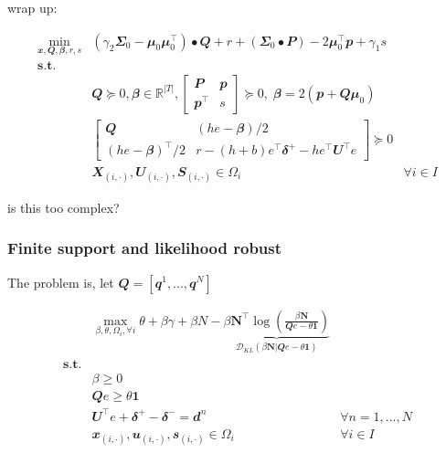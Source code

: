 \documentclass[
  a4paper,
,tablecaptionabove
]{scrartcl}
\numberwithin{equation}{section}
\begin{document}
wrap up:

\[\begin{aligned}
\min_{\mathbfit{x}, \mathbfit{Q}, \mathbfit{\beta}, r, s} & \left(\gamma_{2} \mathbfit{\Sigma}_{0}-\mathbfit{\mu}_{0} \mathbfit{\mu}_{0}^{\top}\right) \bullet \mathbfit{Q}+r+\left(\mathbfit{\Sigma}_{0} \bullet \mathbfit{P}\right)-2 \mathbfit{\mu}_{0}^{\top} \mathbfit{p} + \gamma_{1} s \\
\mathbf { s.t. } & \\
& \mathbfit{Q} \succeq 0, \mathbfit{\beta} \in \mathbb{R}^{|T|}, 
\begin{bmatrix}
  \mathbfit{P} & \mathbfit{p} \\
  \mathbfit{p}^\top & s
\end{bmatrix} \succeq 0, \; 
\mathbfit \beta = 2 (\mathbfit p + \mathbfit{Q\mu}_0)\\
& \begin{bmatrix}
  \mathbfit Q &  (he- \mathbfit \beta)/2 \\
  (he- \mathbfit \beta)^\top/2 & r - (h+b)e^\top \mathbfit \delta^+ - h e^\top   \mathbfit U^\top e
\end{bmatrix} \succeq 0 \\
& \mathbfit X_{(i,\cdot)}, \mathbfit U_{(i,\cdot)}, \mathbfit S_{(i,\cdot)} \in \Omega_i & \forall i\in I
\end{aligned}\]

is this too complex?

\hypertarget{finite-support-and-likelihood-robust}{%
\subsubsection{Finite support and likelihood
robust}\label{finite-support-and-likelihood-robust}}

The problem is, let
\(\mathbfit Q = [\mathbfit{q}^1, ..., \mathbfit{q}^N]\)

\[\begin{aligned}
  & \max_{\beta, \theta, \Omega_i, \forall i} \theta + \beta \gamma +  \beta N - \underbrace{\beta \mathbf N^\top \log(\frac{\beta \mathbf N}{\mathbfit{Q} e-\theta \mathbf 1})}_{\mathcal D_{KL}(\beta \mathbf N | \mathbfit{Q} e-\theta \mathbf 1)}  \\
  \textbf {s.t.} \\
  & \beta \ge 0 \\
  & \mathbfit{Q} e \ge \theta \mathbf 1 \\ 
  & \mathbfit{U} ^\top e + \mathbfit \delta^+ - \mathbfit \delta^-  = \mathbfit d^n & \forall n = 1, ..., N \\
  & \mathbfit x_{(i,\cdot)}, \mathbfit u_{(i,\cdot)}, \mathbfit s_{(i,\cdot)} \in \Omega_i & \forall i\in I
\end{aligned}\]
\end{document}
